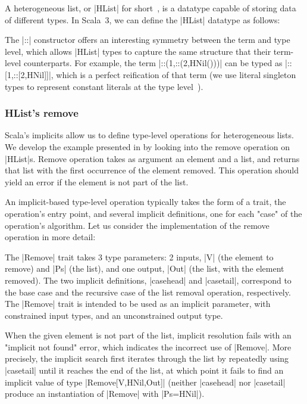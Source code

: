 A heterogeneous list, or |HList| for short~\citep{kiselyov2004strongly}, is a datatype capable of storing data of different types.
In Scala~3, we can define the |HList| datatype as follows:

\hlistEnumDefinition

\noindent
The |::| constructor offers an interesting symmetry between the term and type level, which allows |HList| types to capture the same structure that their term-level counterparts.
For example, the term |::(1,::(2,HNil()))| can be typed as |::[1,::[2,HNil]]|, which is a perfect reification of that term (we use literal singleton types to represent constant literals at the type level~\citep{leontiev2014sip}).

\subsubsection{HList's remove}
\label{sec:hlists-remove}

Scala's implicits allow us to define type-level operations for heterogeneous lists.
We develop the example presented in  by looking into the remove operation on |HList|s.
Remove operation takes as argument an element and a list, and returns that list with the first occurrence of the element removed.
This operation should yield an error if the element is not part of the list.

An implicit-based type-level operation typically takes the form of a trait, the operation's entry point, and several implicit definitions, one for each "case" of the operation's algorithm.
Let us consider the implementation of the remove operation in more detail:

\memImplicitRemove

\noindent
The |Remove| trait takes 3 type parameters: 2 inputs, |V| (the element to remove) and |Ps| (the list), and one output, |Out| (the list, with the element removed).
The two implicit definitions, |casehead| and |casetail|, correspond to the base case and the recursive case of the list removal operation, respectively.
The |Remove| trait is intended to be used as an implicit parameter, with constrained input types, and an unconstrained output type.

When the given element is not part of the list, implicit resolution fails with an "implicit not found" error, which indicates the incorrect use of |Remove|.
More precisely, the implicit search first iterates through the list by repeatedly using |casetail| until it reaches the end of the list, at which point it fails to find an implicit value of type |Remove[V,HNil,Out]| (neither |casehead| nor |casetail| produce an instantiation of |Remove| with |Ps=HNil|).

